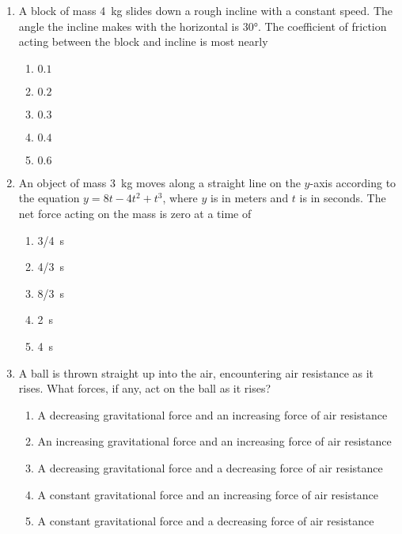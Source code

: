 \documentclass{../../oss-apphys}
\begin{document}
\begin{multicols}{2}
\begin{enumerate}[resume,leftmargin=18pt]
  \item A block of mass \SI{4}{\kilo\gram} slides down a rough incline with a
    constant speed. The angle the incline makes with the horizontal is
    \ang{30}. The coefficient of friction acting between the block and incline
    is most nearly
    \begin{center}
    \end{center}
    \begin{enumerate}[noitemsep,topsep=0pt,leftmargin=18pt,label=(\Alph*)]
    \item $0.1$
    \item $0.2$
    \item $0.3$
    \item $0.4$
    \item $0.6$
    \end{enumerate}

  \item An object of mass \SI{3}{\kilo\gram} moves along a straight line on the
    $y$-axis according to the equation $y=8t-4t^2+t^3$, where $y$ is in meters
    and $t$ is in seconds. The net force acting on the mass is zero at a time of
    \begin{enumerate}[noitemsep,topsep=0pt,leftmargin=18pt,label=(\Alph*)]
    \item\SI{3/4}{\second}
    \item\SI{4/3}{\second}
    \item\SI{8/3}{\second}
    \item\SI{2}{\second}
    \item\SI{4}{\second}
    \end{enumerate}

  \item A ball is thrown straight up into the air, encountering air resistance
    as it rises. What forces, if any, act on the ball as it rises?
    \begin{enumerate}[noitemsep,topsep=0pt,leftmargin=18pt,label=(\Alph*)]
    \item A decreasing gravitational force and an increasing force of air
      resistance
    \item An increasing gravitational force and an increasing force of air
      resistance
    \item A decreasing gravitational force and a decreasing force of air
      resistance
    \item A constant gravitational force and an increasing force of air
      resistance
    \item A constant gravitational force and a decreasing force of air
      resistance
    \end{enumerate}
  \end{enumerate}
  \columnbreak
  

\end{multicols}
\end{document}
